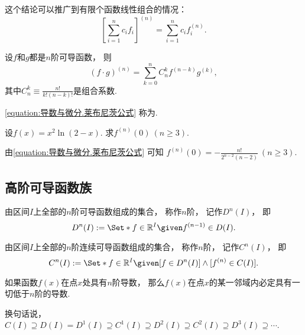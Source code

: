 这个结论可以推广到有限个函数线性组合的情况：\begin{equation}
	\left[ \sum_{i=1}^n c_i f_i \right]^{(n)}
	= \sum_{i=1}^n c_i f_i^{(n)}.
\end{equation}

\begin{theorem}
设\(f\)和\(g\)都是\(n\)阶可导函数，
则\begin{equation}\label{equation:导数与微分.莱布尼茨公式}
	(f \cdot g)^{(n)}
	= \sum_{k=0}^n C_n^k f^{(n-k)} g^{(k)},
\end{equation}
其中\(C_n^k \equiv \frac{n!}{k! (n-k)!}\)是组合系数.
\end{theorem}
\cref{equation:导数与微分.莱布尼茨公式} 称为.

\begin{example}
设\(f(x) = x^2 \ln(2-x)\).
求\(f^{(n)}(0)\ (n\geq3)\).
\begin{solution}
由\cref{equation:导数与微分.莱布尼茨公式} 可知
\(f^{(n)}(0) = -\frac{n!}{2^{n-2} (n-2)}\ (n\geq3)\).
\end{solution}
\end{example}

\subsection{高阶可导函数族}
\begin{definition}\label{definition:函数族.n阶可导函数族}
由区间\(I\)上全部的\(n\)阶可导函数组成的集合，
称作\(n\)阶，
记作\(D^n(I)\)，
即\begin{equation*}
	D^n(I)
	\defeq
	\Set*{
		f\in\mathbb{R}^I
		\given
		f^{(n-1)} \in D(I)
	}.
\end{equation*}
\end{definition}

\begin{definition}\label{definition:函数族.n阶连续可导函数族}
由区间\(I\)上全部的\(n\)阶连续可导函数组成的集合，
称作\(n\)阶，
记作\(C^n(I)\)，
即\begin{equation*}
	C^n(I)
	\defeq
	\Set*{
		f\in\mathbb{R}^I
		\given
		[f\in D^n(I)]
		\land
		[f^{(n)}\in C(I)]
	}.
\end{equation*}
\end{definition}

\begin{theorem}
如果函数\(f(x)\)在点\(x\)处具有\(n\)阶导数，
那么\(f(x)\)在点\(x\)的某一邻域内必定具有一切低于\(n\)阶的导数.
\end{theorem}
换句话说，\(C(I) \supseteq
D(I) = D^1(I) \supseteq
C^1(I) \supseteq
D^2(I) \supseteq
C^2(I) \supseteq
D^3(I) \supseteq
\dotsb\).

